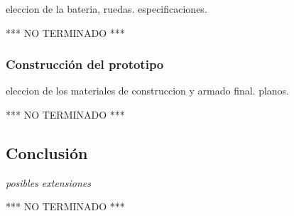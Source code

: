 eleccion de la bateria, ruedas.
especificaciones.




*** NO TERMINADO ***





\subsubsection{Construcci\'on del prototipo}
\label{HACprototipo}

eleccion de los materiales de construccion y armado final.
planos.





*** NO TERMINADO ***




\subsection{Conclusi\'on}
\label{Hconclusion}

\emph{posibles extensiones}



*** NO TERMINADO ***





